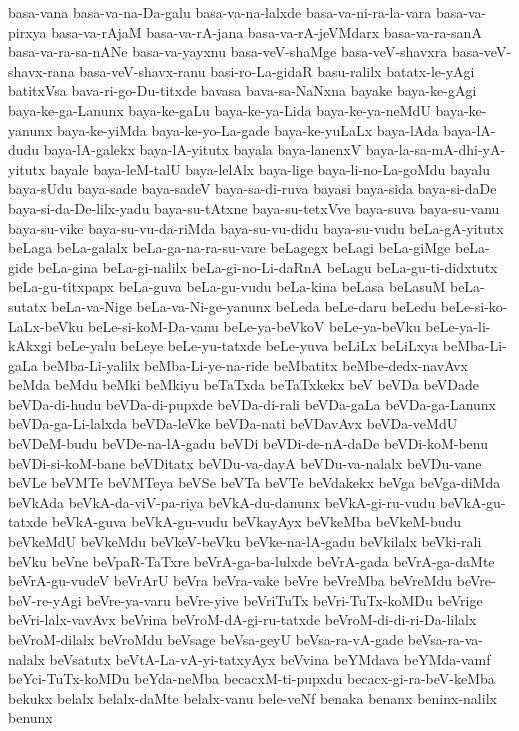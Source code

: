{basa-vana
basa-va-na-Da-galu
basa-va-na-lalxde
basa-va-ni-ra-la-vara
basa-va-pirxya
basa-va-rAjaM
basa-va-rA-jana
basa-va-rA-jeVMdarx
basa-va-ra-sanA
basa-va-ra-sa-nANe
basa-va-yayxnu
basa-veV-shaMge
basa-veV-shavxra
basa-veV-shavx-rana
basa-veV-shavx-ranu
basi-ro-La-gidaR
basu-ralilx
batatx-le-yAgi
batitxVsa
bava-ri-go-Du-titxde
bavasa
bava-sa-NaNxna
bayake
baya-ke-gAgi
baya-ke-ga-Lanunx
baya-ke-gaLu
baya-ke-ya-Lida
baya-ke-ya-neMdU
baya-ke-yanunx
baya-ke-yiMda
baya-ke-yo-La-gade
baya-ke-yuLaLx
baya-lAda
baya-lA-dudu
baya-lA-galekx
baya-lA-yitutx
bayala
baya-lanenxV
baya-la-sa-mA-dhi-yA-yitutx
bayale
baya-leM-talU
baya-lelAlx
baya-lige
baya-li-no-La-goMdu
bayalu
baya-sUdu
baya-sade
baya-sadeV
baya-sa-di-ruva
bayasi
baya-sida
baya-si-daDe
baya-si-da-De-lilx-yadu
baya-su-tAtxne
baya-su-tetxVve
baya-suva
baya-su-vanu
baya-su-vike
baya-su-vu-da-riMda
baya-su-vu-didu
baya-su-vudu
beLa-gA-yitutx
beLaga
beLa-galalx
beLa-ga-na-ra-su-vare
beLagegx
beLagi
beLa-giMge
beLa-gide
beLa-gina
beLa-gi-nalilx
beLa-gi-no-Li-daRnA
beLagu
beLa-gu-ti-didxtutx
beLa-gu-titxpapx
beLa-guva
beLa-gu-vudu
beLa-kina
beLasa
beLasuM
beLa-sutatx
beLa-va-Nige
beLa-va-Ni-ge-yanunx
beLeda
beLe-daru
beLedu
beLe-si-ko-LaLx-beVku
beLe-si-koM-Da-vanu
beLe-ya-beVkoV
beLe-ya-beVku
beLe-ya-li-kAkxgi
beLe-yalu
beLeye
beLe-yu-tatxde
beLe-yuva
beLiLx
beLiLxya
beMba-Li-gaLa
beMba-Li-yalilx
beMba-Li-ye-na-ride
beMbatitx
beMbe-dedx-navAvx
beMda
beMdu
beMki
beMkiyu
beTaTxda
beTaTxkekx
beV
beVDa
beVDade
beVDa-di-hudu
beVDa-di-pupxde
beVDa-di-rali
beVDa-gaLa
beVDa-ga-Lanunx
beVDa-ga-Li-lalxda
beVDa-leVke
beVDa-nati
beVDavAvx
beVDa-veMdU
beVDeM-budu
beVDe-na-lA-gadu
beVDi
beVDi-de-nA-daDe
beVDi-koM-benu
beVDi-si-koM-bane
beVDitatx
beVDu-va-dayA
beVDu-va-nalalx
beVDu-vane
beVLe
beVMTe
beVMTeya
beVSe
beVTa
beVTe
beVdakekx
beVga
beVga-diMda
beVkAda
beVkA-da-viV-pa-riya
beVkA-du-danunx
beVkA-gi-ru-vudu
beVkA-gu-tatxde
beVkA-guva
beVkA-gu-vudu
beVkayAyx
beVkeMba
beVkeM-budu
beVkeMdU
beVkeMdu
beVkeV-beVku
beVke-na-lA-gadu
beVkilalx
beVki-rali
beVku
beVne
beVpaR-TaTxre
beVrA-ga-ba-lulxde
beVrA-gada
beVrA-ga-daMte
beVrA-gu-vudeV
beVrArU
beVra
beVra-vake
beVre
beVreMba
beVreMdu
beVre-beV-re-yAgi
beVre-ya-varu
beVre-yive
beVriTuTx
beVri-TuTx-koMDu
beVrige
beVri-lalx-vavAvx
beVrina
beVroM-dA-gi-ru-tatxde
beVroM-di-di-ri-Da-lilalx
beVroM-dilalx
beVroMdu
beVsage
beVsa-geyU
beVsa-ra-vA-gade
beVsa-ra-va-nalalx
beVsatutx
beVtA-La-vA-yi-tatxyAyx
beVvina
beYMdava
beYMda-vamf
beYci-TuTx-koMDu
beYda-neMba
becacxM-ti-pupxdu
becacx-gi-ra-beV-keMba
bekukx
belalx
belalx-daMte
belalx-vanu
bele-veNf
benaka
benanx
beninx-nalilx
benunx
}
